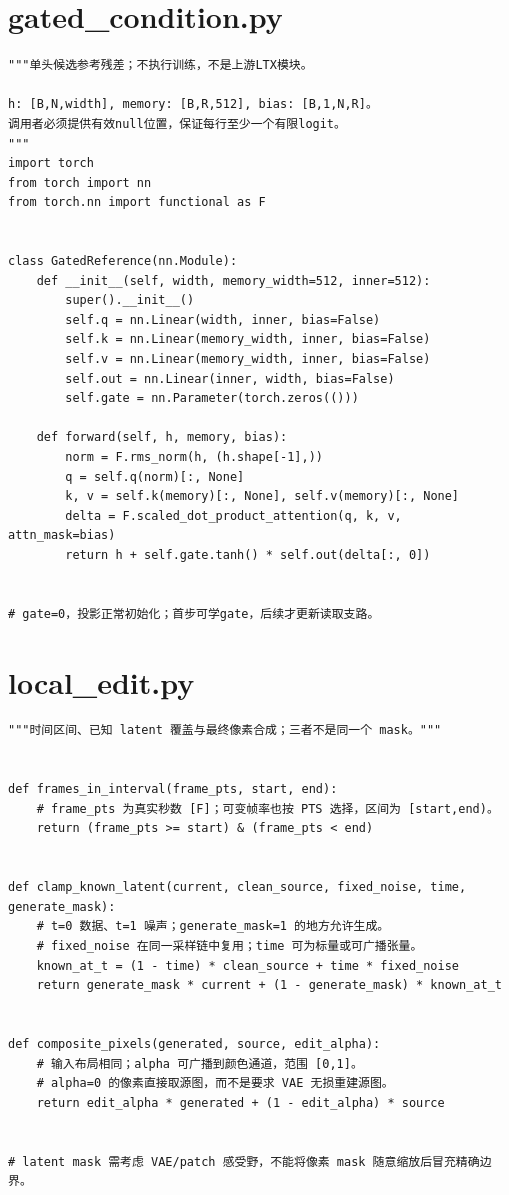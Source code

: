 \section{gated\_condition.py}
\label{code-gated-condition}
\begin{verbatim}
"""单头候选参考残差；不执行训练，不是上游LTX模块。

h: [B,N,width], memory: [B,R,512], bias: [B,1,N,R]。
调用者必须提供有效null位置，保证每行至少一个有限logit。
"""
import torch
from torch import nn
from torch.nn import functional as F


class GatedReference(nn.Module):
    def __init__(self, width, memory_width=512, inner=512):
        super().__init__()
        self.q = nn.Linear(width, inner, bias=False)
        self.k = nn.Linear(memory_width, inner, bias=False)
        self.v = nn.Linear(memory_width, inner, bias=False)
        self.out = nn.Linear(inner, width, bias=False)
        self.gate = nn.Parameter(torch.zeros(()))

    def forward(self, h, memory, bias):
        norm = F.rms_norm(h, (h.shape[-1],))
        q = self.q(norm)[:, None]
        k, v = self.k(memory)[:, None], self.v(memory)[:, None]
        delta = F.scaled_dot_product_attention(q, k, v, attn_mask=bias)
        return h + self.gate.tanh() * self.out(delta[:, 0])


# gate=0，投影正常初始化；首步可学gate，后续才更新读取支路。
\end{verbatim}

\section{local\_edit.py}
\label{code-local-edit}
\begin{verbatim}
"""时间区间、已知 latent 覆盖与最终像素合成；三者不是同一个 mask。"""


def frames_in_interval(frame_pts, start, end):
    # frame_pts 为真实秒数 [F]；可变帧率也按 PTS 选择，区间为 [start,end)。
    return (frame_pts >= start) & (frame_pts < end)


def clamp_known_latent(current, clean_source, fixed_noise, time, generate_mask):
    # t=0 数据、t=1 噪声；generate_mask=1 的地方允许生成。
    # fixed_noise 在同一采样链中复用；time 可为标量或可广播张量。
    known_at_t = (1 - time) * clean_source + time * fixed_noise
    return generate_mask * current + (1 - generate_mask) * known_at_t


def composite_pixels(generated, source, edit_alpha):
    # 输入布局相同；alpha 可广播到颜色通道，范围 [0,1]。
    # alpha=0 的像素直接取源图，而不是要求 VAE 无损重建源图。
    return edit_alpha * generated + (1 - edit_alpha) * source


# latent mask 需考虑 VAE/patch 感受野，不能将像素 mask 随意缩放后冒充精确边界。
\end{verbatim}

